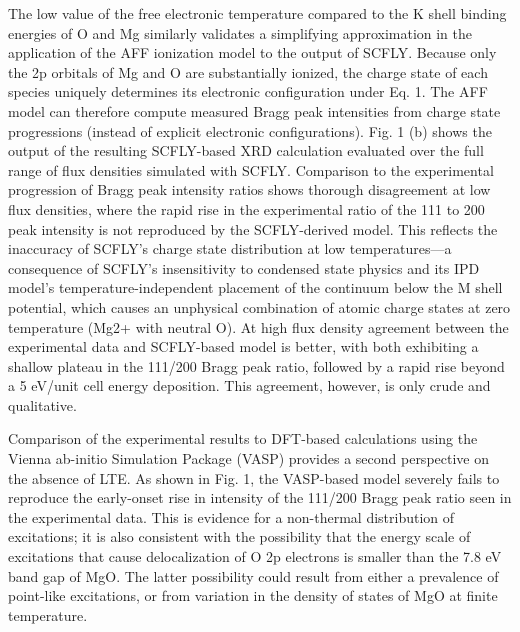 The low value of the free electronic temperature compared to the K shell
binding energies of O and Mg similarly validates a simplifying
approximation in the application of the AFF ionization model to the
output of SCFLY. Because only the 2p orbitals of Mg and O are
substantially ionized, the charge state of each species uniquely
determines its electronic configuration under Eq. 1. The AFF model can therefore compute
measured Bragg peak intensities from charge state progressions (instead
of explicit electronic configurations). Fig. 1 (b) shows the output of
the resulting SCFLY-based XRD calculation evaluated over the full range
of flux densities simulated with SCFLY. Comparison to the experimental
progression of Bragg peak intensity ratios shows thorough disagreement
at low flux densities, where the rapid rise in the experimental ratio of
the 111 to 200 peak intensity is not reproduced by the SCFLY-derived
model. This reflects the inaccuracy of SCFLY's charge state distribution
at low temperatures---a consequence of SCFLY's insensitivity to
condensed state physics and its IPD model's temperature-independent
placement of the continuum below the M shell potential, which causes an
unphysical combination of atomic charge states at zero temperature (Mg2+
with neutral O). At high flux density agreement between the experimental
data and SCFLY-based model is better, with both exhibiting a shallow
plateau in the 111/200 Bragg peak ratio, followed by a rapid rise beyond
a 5 eV/unit cell energy deposition. This agreement, however, is only
crude and qualitative.

Comparison of the experimental results to DFT-based calculations using
the Vienna ab-initio Simulation Package (VASP) provides a second
perspective on the absence of LTE. As shown in Fig. 1, the VASP-based
model severely fails to reproduce the early-onset rise in intensity of
the 111/200 Bragg peak ratio seen in the experimental data. This is
evidence for a non-thermal distribution of excitations; it is also
consistent with the possibility that the energy scale of excitations
that cause delocalization of O 2p electrons is smaller than the 7.8 eV
band gap of MgO. The latter possibility could result from either a prevalence
of point-like excitations, or from variation in the density of states of
MgO at finite temperature.

